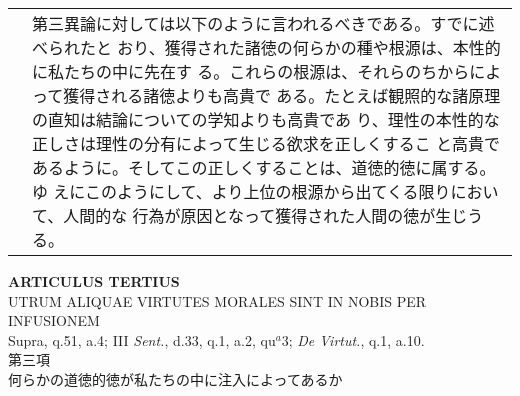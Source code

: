 \documentclass[10pt]{jsarticle}
\begin{document}
\begin{longtable}{p{21em}p{21em}}
&

 第三異論に対しては以下のように言われるべきである。すでに述べられたと
 おり、獲得された諸徳の何らかの種や根源は、本性的に私たちの中に先在す
 る。これらの根源は、それらのちからによって獲得される諸徳よりも高貴で
 ある。たとえば観照的な諸原理の直知は結論についての学知よりも高貴であ
 り、理性の本性的な正しさは理性の分有によって生じる欲求を正しくするこ
 と高貴であるように。そしてこの正しくすることは、道徳的徳に属する。ゆ
 えにこのようにして、より上位の根源から出てくる限りにおいて、人間的な
 行為が原因となって獲得された人間の徳が生じうる。
 

\end{longtable}
\newpage


\begin{center}
{\Large {\bf ARTICULUS TERTIUS}}\\
{\large UTRUM ALIQUAE VIRTUTES MORALES SINT IN NOBIS PER INFUSIONEM}\\
{\footnotesize Supra, q.51, a.4; III {\itshape Sent.}, d.33, q.1, a.2, qu$^{a}$3; {\itshape De Virtut.}, q.1, a.10.}\\
{\Large 第三項\\何らかの道徳的徳が私たちの中に注入によってあるか}
\end{center}
\end{document}
